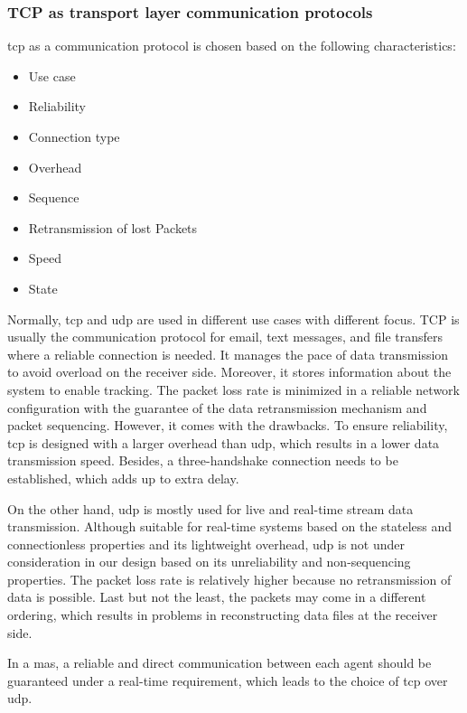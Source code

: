 \subsubsection{TCP as transport layer communication protocols}
\gls{tcp} as a communication protocol is chosen based on the following characteristics: 
\begin{itemize}
    \item Use case
    \item Reliability
    \item Connection type
    \item Overhead 
    \item Sequence
    \item Retransmission of lost Packets
    \item Speed
    \item State
\end{itemize}
Normally, \gls{tcp} and \gls{udp} are used in different use cases with different focus. 
TCP is usually the communication protocol for email, text messages, and file transfers where a 
reliable connection is needed. It manages the pace of data transmission to avoid overload on 
the receiver side. Moreover, it stores information about the system to enable tracking. The 
packet loss rate is minimized in a reliable network configuration with the guarantee of the 
data retransmission mechanism and packet sequencing. However, it comes with the 
drawbacks. To ensure  
reliability, \gls{tcp} is designed with a larger overhead than \gls{udp}, which results in a 
lower data transmission speed. Besides, a three-handshake connection needs to be established, which adds up to extra delay. 


On the other hand, \gls{udp} is mostly used for live and real-time stream data transmission. 
Although suitable for real-time systems based on the stateless and connectionless 
properties and its lightweight overhead, \gls{udp} is not under consideration in our 
design based on its unreliability and non-sequencing properties. The packet loss rate is 
relatively higher because no retransmission of data is possible. Last but not the least, 
the packets may come in a different ordering, which results in problems in reconstructing 
data files at the receiver side.  

In a \gls{mas}, a reliable and direct communication between each agent should be 
guaranteed under a real-time requirement, 
which leads to the choice of \gls{tcp} over \gls{udp}. 
 


